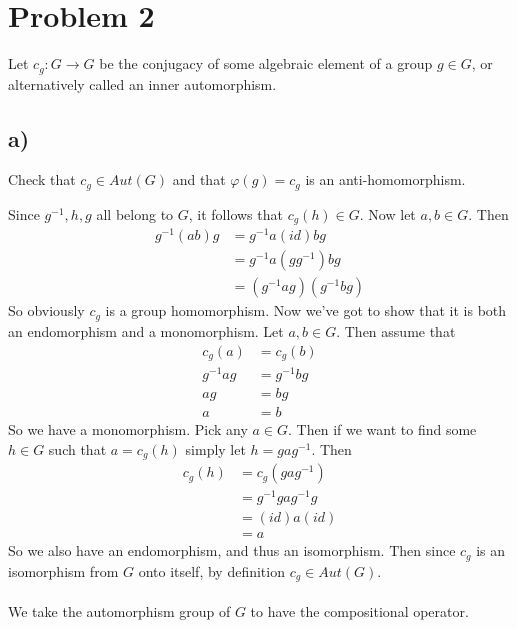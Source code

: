 \documentclass{article}
\theoremstyle{definition}
\begin{document}
\section*{Problem 2}
    Let $c_g: G \rightarrow G$ be the conjugacy of some algebraic element of a group $g \in G$, or alternatively 
    called an inner automorphism.
    \subsection*{a)}
        \begin{mdframed}
            Check that $c_g \in Aut(G)$ and that $\varphi(g) = c_g$ is an anti-homomorphism.
        \end{mdframed}
         Since $g^{-1}, h, g$ all belong to $G$, it follows that $c_g(h) \in G$.
        Now let $a,b \in G$. Then
        \begin{align*}
            g^{-1} (ab) g & = g^{-1}a (id) b g \\
            &= g^{-1}a(g g^{-1})bg \\
            &=(g^{-1}ag)(g^{-1}bg)
        \end{align*}
        So obviously $c_g$ is a group homomorphism. Now we've got to show that it is both an endomorphism and a monomorphism.
        Let $a,b \in G$. Then assume that 
        \begin{align*}
            c_g(a) &= c_g(b) \\
            g^{-1}ag &= g^{-1}bg \\
            ag &= bg\\
            a & = b
        \end{align*}
        So we have a monomorphism. Pick any $a \in G$. Then if we want to find some $h \in G$  such that 
        $a = c_g(h)$ simply let $h = gag^{-1}$. Then 
        \begin{align*}
            c_g(h) &= c_g(gag^{-1})\\
            &= g^{-1}gag^{-1}g\\
            &= (id)a(id)\\
            &= a
        \end{align*}
        So we also have an endomorphism, and thus an isomorphism. Then since $c_g$ is an isomorphism from $G$ onto itself,
        by definition $c_g \in Aut(G)$.\\\\
         We take the automorphism group of $G$ to have the compositional operator.
\end{document}
